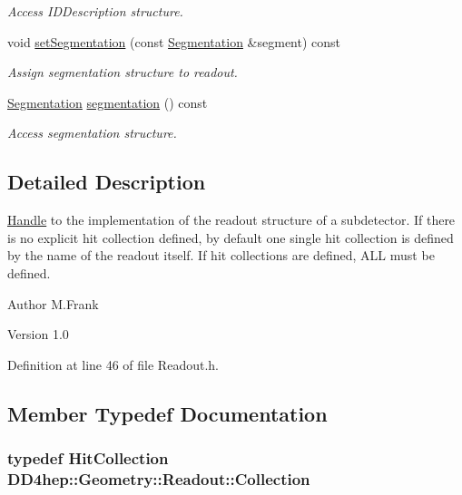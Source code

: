 \begin{DoxyCompactItemize}
\begin{DoxyCompactList}\small\item\em Access IDDescription structure. \item\end{DoxyCompactList}\item 
void \hyperlink{class_d_d4hep_1_1_geometry_1_1_readout_a15905d5ccdd52d5c1b1c5f4505f7c76d}{setSegmentation} (const \hyperlink{class_d_d4hep_1_1_geometry_1_1_segmentation}{Segmentation} \&segment) const 
\begin{DoxyCompactList}\small\item\em Assign segmentation structure to readout. \item\end{DoxyCompactList}\item 
\hyperlink{class_d_d4hep_1_1_geometry_1_1_segmentation}{Segmentation} \hyperlink{class_d_d4hep_1_1_geometry_1_1_readout_adad600720144e8431771098ad2dc4478}{segmentation} () const 
\begin{DoxyCompactList}\small\item\em Access segmentation structure. \item\end{DoxyCompactList}\end{DoxyCompactItemize}


\subsection{Detailed Description}
\hyperlink{class_d_d4hep_1_1_handle}{Handle} to the implementation of the readout structure of a subdetector. If there is no explicit hit collection defined, by default one single hit collection is defined by the name of the readout itself. If hit collections are defined, ALL must be defined.

\begin{DoxyAuthor}{Author}
M.Frank 
\end{DoxyAuthor}
\begin{DoxyVersion}{Version}
1.0 
\end{DoxyVersion}


Definition at line 46 of file Readout.h.

\subsection{Member Typedef Documentation}
\hypertarget{class_d_d4hep_1_1_geometry_1_1_readout_ac1c39a13ec9bd42d658319fa48cac81d}{
\subsubsection[{Collection}]{\setlength{\rightskip}{0pt plus 5cm}typedef {\bf HitCollection} {\bf DD4hep::Geometry::Readout::Collection}}}
\label{class_d_d4hep_1_1_geometry_1_1_readout_ac1c39a13ec9bd42d658319fa48cac81d}


